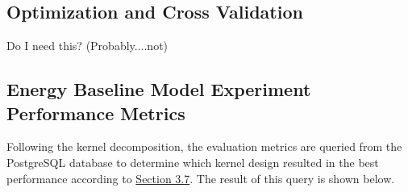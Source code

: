\subsection{Optimization and Cross Validation}

Do I need this? (Probably....not)

\subsection{Energy Baseline Model Experiment Performance Metrics}

Following the kernel decomposition, the evaluation metrics are queried from the PostgreSQL database to determine which kernel design resulted in the best performance according to \hyperlink{subsection.3.7}{Section 3.7}. The result of this query is shown below.

